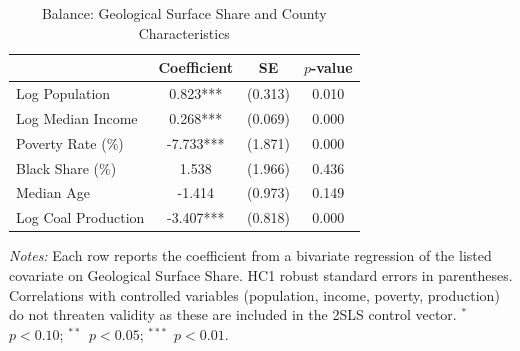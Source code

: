 \begin{table}[t]
\centering
\caption{Balance: Geological Surface Share and County Characteristics}
\label{tab:balance}
\begin{tabular}{lccc}
\hline\hline
 & Coefficient & SE & $p$-value \\
\hline
Log Population & 0.823*** & (0.313) & 0.010 \\
Log Median Income & 0.268*** & (0.069) & 0.000 \\
Poverty Rate (\%) & -7.733*** & (1.871) & 0.000 \\
Black Share (\%) & 1.538 & (1.966) & 0.436 \\
Median Age & -1.414 & (0.973) & 0.149 \\
Log Coal Production & -3.407*** & (0.818) & 0.000 \\
\hline\hline
\end{tabular}
\begin{tablenotes}
\item \textit{Notes:} Each row reports the coefficient from a bivariate regression of the listed covariate on Geological Surface Share. HC1 robust standard errors in parentheses. Correlations with controlled variables (population, income, poverty, production) do not threaten validity as these are included in the 2SLS control vector. $^{*}$~$p<0.10$; $^{**}$~$p<0.05$; $^{***}$~$p<0.01$.
\end{tablenotes}
\end{table}

